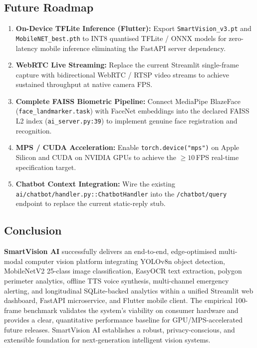 \documentclass[conference]{IEEEtran}
\begin{document}
\subsection{Future Roadmap}
\begin{enumerate}
    \item \textbf{On-Device TFLite Inference (Flutter):} Export
          \texttt{SmartVision\_v3.pt} and \texttt{MobileNET\_best.pth} to INT8
          quantised TFLite / ONNX models for zero-latency mobile inference
          eliminating the FastAPI server dependency.
    \item \textbf{WebRTC Live Streaming:} Replace the current Streamlit
          single-frame capture with bidirectional WebRTC / RTSP video streams
          to achieve sustained throughput at native camera FPS.
    \item \textbf{Complete FAISS Biometric Pipeline:} Connect MediaPipe
          BlazeFace (\texttt{face\_landmarker.task}) with FaceNet embeddings
          into the declared FAISS L2 index (\texttt{ai\_server.py:39}) to
          implement genuine face registration and recognition.
    \item \textbf{MPS / CUDA Acceleration:} Enable
          \texttt{torch.device("mps")} on Apple Silicon and CUDA on NVIDIA
          GPUs to achieve the $\ge10$\,FPS real-time specification target.
    \item \textbf{Chatbot Context Integration:} Wire the existing
          \texttt{ai/chatbot/handler.py::ChatbotHandler} into the
          \texttt{/chatbot/query} endpoint to replace the current static-reply stub.
\end{enumerate}

\subsection{Conclusion}
\textbf{SmartVision AI} successfully delivers an end-to-end, edge-optimised
multi-modal computer vision platform integrating YOLOv8n object detection,
MobileNetV2 25-class image classification, EasyOCR text extraction, polygon
perimeter analytics, offline TTS voice synthesis, multi-channel emergency
alerting, and longitudinal SQLite-backed analytics within a unified Streamlit
web dashboard, FastAPI microservice, and Flutter mobile client. The empirical
100-frame benchmark validates the system's viability on consumer hardware and
provides a clear, quantitative performance baseline for GPU/MPS-accelerated
future releases. SmartVision AI establishes a robust, privacy-conscious, and
extensible foundation for next-generation intelligent vision systems.
\end{document}
